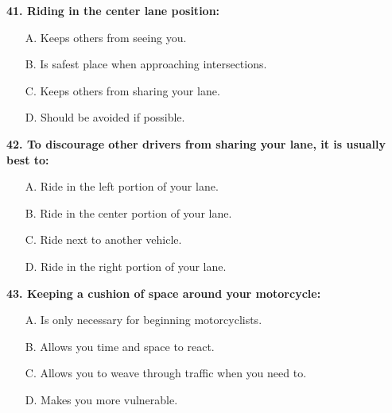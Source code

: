 \begin{minipage}{\linewidth}
\vspace{1em}\noindent\textbf{41. Riding in the center lane position:}

\begin{itemize}[nosep,leftmargin=2em]
\item [A.] Keeps others from seeing you.
\item [B.] Is safest place when approaching intersections.
\item [C.] Keeps others from sharing your lane.
\item [D.] Should be avoided if possible.

\end{itemize}
\end{minipage}


\begin{minipage}{\linewidth}
\vspace{1em}\noindent\textbf{42. To discourage other drivers from sharing your lane, it is usually best to:}

\begin{itemize}[nosep,leftmargin=2em]
\item [A.] Ride in the left portion of your lane.
\item [B.] Ride in the center portion of your lane.
\item [C.] Ride next to another vehicle.
\item [D.] Ride in the right portion of your lane.

\end{itemize}
\end{minipage}


\begin{minipage}{\linewidth}
\vspace{1em}\noindent\textbf{43. Keeping a cushion of space around your motorcycle:}

\begin{itemize}[nosep,leftmargin=2em]
\item [A.] Is only necessary for beginning motorcyclists.
\item [B.] Allows you time and space to react.
\item [C.] Allows you to weave through traffic when you need to.
\item [D.] Makes you more vulnerable.

\end{itemize}
\end{minipage}


